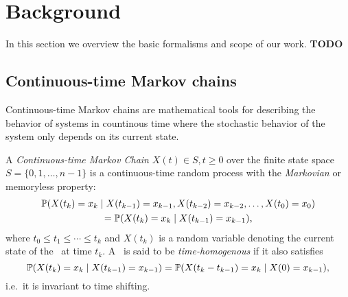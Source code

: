 \chapter{Background}
\label{chap:background}

In this section we overview the basic formalisms and scope of our
work. \textbf{TODO}

\section{Continuous-time Markov chains}

Continuous-time Markov chains are mathematical tools for describing the
behavior of systems in countinous time where the stochastic behavior of
the system only depends on its current state.

\begin{dfn}
  A \emph{Continuous-time Markov Chain} \paren{\CTMC}
  $X(t) \in S, t \ge 0$ over the finite state
  space $S = \{0, 1, \ldots, n - 1\}$ is a continuous-time random
  process with the \emph{Markovian} or memoryless property:
  \begin{multline}\allowdisplaybreaks[0]
    \Pr(X(t_k) = x_k \mid X(t_{k - 1}) = x_{k - 1}, X(t_{k -
      2}) = x_{k - 2}, \ldots, X(t_{0}) = x_{0}) \\
    = \Pr(X(t_k) = x_k \mid X(t_{k - 1}) = x_{k - 1}) \text,
  \end{multline}
  where $t_0 \le t_1 \le \cdots \le t_k$ and $X(t_k)$ is a random variable denoting the current state of the \CTMC\ at time $t_k$. A \CTMC\ is said to be
  \emph{time-homogenous} if it also satisfies
  \begin{equation}
    \Pr(X(t_k) = x_k \mid X(t_{k - 1}) = x_{k - 1}) = \Pr(X(t_k - t_{k -
      1}) = x_k \mid X(0) = x_{k - 1}) \text,
  \end{equation}
  i.e.~it is invariant to time shifting.
\end{dfn}

